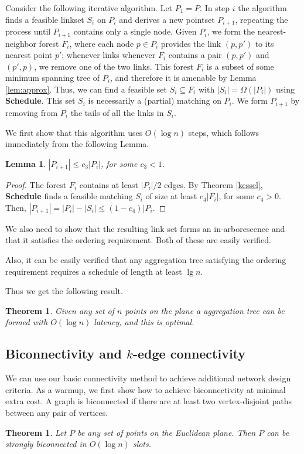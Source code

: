 \documentclass[11pt]{amsart}
\newcounter{foo}
\newtheorem{theorem}[foo]{Theorem}
\newtheorem{lemma}[foo]{Lemma}
\begin{document}
Consider the following iterative algorithm. 
Let $P_1 = P$.
In step $i$ the algorithm finds a feasible linkset $S_i$ on $P_i$ and derives a new pointset $P_{i+1}$, repeating the process until $P_{i+1}$ contains only a single node.
Given $P_i$, we form the nearest-neighbor forest $F_i$, where each node $p \in P_i$ provides the link $(p, p')$ to its nearest point $p'$; whenever links
whenever $F_i$ contains a pair $(p, p')$ and $(p',p)$, we remove one of the two links. This forest $F_i$ is a subset of some minimum spanning tree of $P_i$, and therefore it is amenable by Lemma \ref{lem:approx}. 
Thus, we can find a feasible set $S_i \subseteq F_i$ with $|S_i| = \Omega(|P_i|)$
using \textbf{Schedule}.
This set $S_i$ is necessarily a (partial) matching on $P_i$.
We form $P_{i+1}$ by removing from $P_i$ the tails of all the links in $S_i$.

We first show that this algorithm uses $O(\log n)$ steps, which follows immediately from the following Lemma.

\begin{lemma}
$|P_{i+1}| \leq c_3 |P_{i}|$, for some $c_3 < 1$.
\end{lemma}
\begin{proof}
The forest $F_i$ contains at least $|P_i|/2$ edges.
By Theorem \ref{kessel}, \textbf{Schedule} finds a feasible matching $S_i$ of size at least $c_4 |F_i|$, for some $c_4 > 0$.
Then, $|P_{i+1}| = |P_i| - |S_i| \le (1 - c_4)|P_i$.
\end{proof}

We also need to show that the resulting link set forms an in-arborescence and that it satisfies the ordering requirement.
Both of these are easily verified.


Also, it can be easily verified that any aggregation tree satisfying the ordering requirement requires a schedule of length at least $\lg n$. 


Thus we get the following result.
\begin{theorem}
Given any set of $n$ points on the plane a aggregation tree can be formed with $O(\log n)$ latency, and this is optimal.
\end{theorem}



\subsection{Biconnectivity and $k$-edge connectivity}

We can use our basic connectivity method to achieve additional network
design criteria. 
As a warmup, we first show how to achieve biconnectivity at minimal extra cost.
A graph is biconnected if there are at least two vertex-disjoint paths between
any pair of vertices.
\begin{theorem}
Let $P$ be any set of points on the Euclidean plane. Then $P$ can be
strongly biconnected in $O(\log n)$ slots.
\label{mainth3}
\end{theorem}
\end{document}
